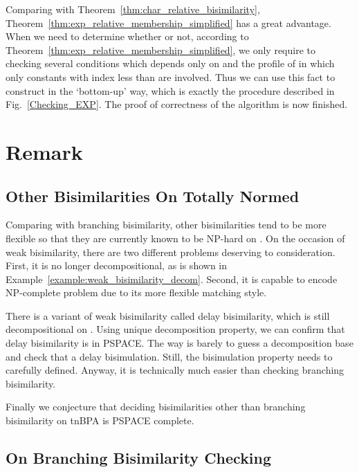 \documentclass{llncs}
\begin{document}
Comparing with Theorem~\ref{thm:char_relative_bisimilarity}, Theorem~\ref{thm:exp_relative_membership_simplified} has a great advantage.  When we need to determine whether  or not, according to Theorem~\ref{thm:exp_relative_membership_simplified}, we only require to checking several conditions which depends only on  and the profile of  in which only constants with index less than  are involved. Thus we can use this fact to construct  in the `bottom-up' way, which is exactly the procedure described in Fig.~\ref{Checking_EXP}. The proof of correctness of the algorithm is now finished.





\section{Remark}\label{sec:remark}




\subsection{Other Bisimilarities On Totally Normed }
Comparing with branching bisimilarity, other bisimilarities tend to be more flexible so that they are currently known to be NP-hard on .  On the occasion of weak bisimilarity, there are two different problems deserving to consideration. First, it is no longer decompositional, as is shown in Example~\ref{example:weak_bisimilarity_decom}.  Second, it is capable to encode NP-complete problem due to its more flexible matching style.

There is a variant of weak bisimilarity called delay bisimilarity, which is still decompositional on . Using unique decomposition property, we can confirm that delay bisimilarity is in PSPACE. The way is barely to guess a decomposition base  and check that  a delay bisimulation.  Still, the bisimulation property needs to carefully defined.  Anyway, it is technically much easier than checking branching bisimilarity.

Finally we conjecture that deciding bisimilarities other than branching bisimilarity on tnBPA is PSPACE complete.





\subsection{On Branching Bisimilarity Checking}
\end{document}
